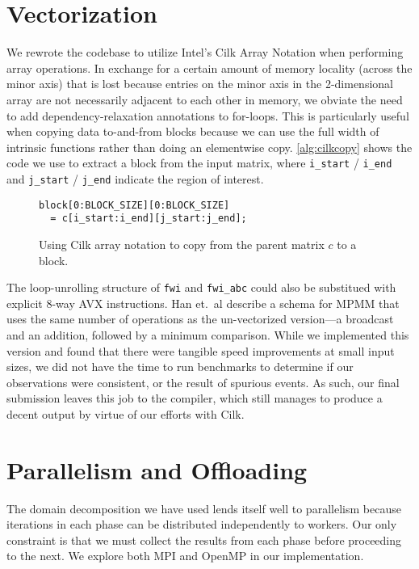 \documentclass{scrartcl}
\begin{document}
  \section{Vectorization}
  We rewrote the codebase to utilize Intel's Cilk Array Notation when performing array operations. In exchange for a certain amount of memory locality (across the minor axis) that is lost because entries on the minor axis in the 2-dimensional array are not necessarily adjacent to each other in memory, we obviate the need to add dependency-relaxation annotations to for-loops. This is particularly useful when copying data to-and-from blocks because we can use the full width of intrinsic functions rather than doing an elementwise copy. \autoref{alg:cilkcopy} shows the code we use to extract a block from the input matrix, where \texttt{i\_start} / \texttt{i\_end} and \texttt{j\_start} / \texttt{j\_end} indicate the region of interest.

  \begin{figure}[ht!]
    \begin{lstlisting}
block[0:BLOCK_SIZE][0:BLOCK_SIZE]
  = c[i_start:i_end][j_start:j_end];
    \end{lstlisting}
    \caption{Using Cilk array notation to copy from the parent matrix $c$ to a block.\label{alg:cilkcopy}}
  \end{figure}

  The loop-unrolling structure of \texttt{fwi} and \texttt{fwi\_abc} could also be substitued with explicit 8-way AVX instructions. Han et.~al describe a schema for MPMM that uses the same number of operations as the un-vectorized version---a broadcast and an addition, followed by a minimum comparison. While we implemented this version and found that there were tangible speed improvements at small input sizes, we did not have the time to run benchmarks to determine if our observations were consistent, or the result of spurious events. As such, our final submission leaves this job to the compiler, which still manages to produce a decent output by virtue of our efforts with Cilk.
  \section{Parallelism and Offloading}
  The domain decomposition we have used lends itself well to parallelism because iterations in each phase can be distributed independently to workers. Our only constraint is that we must collect the results from each phase before proceeding to the next. We explore both MPI and OpenMP in our implementation.
\end{document}
